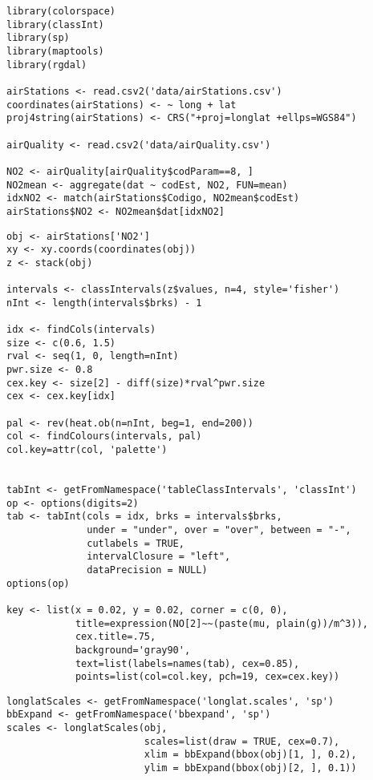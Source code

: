 



\lstset{language=R}
\begin{lstlisting}
library(colorspace)
library(classInt)
library(sp)
library(maptools)
library(rgdal)

airStations <- read.csv2('data/airStations.csv')
coordinates(airStations) <- ~ long + lat
proj4string(airStations) <- CRS("+proj=longlat +ellps=WGS84")

airQuality <- read.csv2('data/airQuality.csv')

NO2 <- airQuality[airQuality$codParam==8, ]
NO2mean <- aggregate(dat ~ codEst, NO2, FUN=mean)
idxNO2 <- match(airStations$Codigo, NO2mean$codEst)
airStations$NO2 <- NO2mean$dat[idxNO2]
\end{lstlisting}


\lstset{language=R}
\begin{lstlisting}
obj <- airStations['NO2']
xy <- xy.coords(coordinates(obj))
z <- stack(obj)

intervals <- classIntervals(z$values, n=4, style='fisher')
nInt <- length(intervals$brks) - 1

idx <- findCols(intervals)
size <- c(0.6, 1.5)
rval <- seq(1, 0, length=nInt)
pwr.size <- 0.8
cex.key <- size[2] - diff(size)*rval^pwr.size 
cex <- cex.key[idx]

pal <- rev(heat.ob(n=nInt, beg=1, end=200))
col <- findColours(intervals, pal)
col.key=attr(col, 'palette')


tabInt <- getFromNamespace('tableClassIntervals', 'classInt')
op <- options(digits=2)
tab <- tabInt(cols = idx, brks = intervals$brks,
              under = "under", over = "over", between = "-", 
              cutlabels = TRUE,
              intervalClosure = "left",
              dataPrecision = NULL)
options(op)

key <- list(x = 0.02, y = 0.02, corner = c(0, 0),
            title=expression(NO[2]~~(paste(mu, plain(g))/m^3)),
            cex.title=.75,
            background='gray90', 
            text=list(labels=names(tab), cex=0.85),
            points=list(col=col.key, pch=19, cex=cex.key))
\end{lstlisting}


\lstset{language=R}
\begin{lstlisting}
longlatScales <- getFromNamespace('longlat.scales', 'sp')
bbExpand <- getFromNamespace('bbexpand', 'sp')
scales <- longlatScales(obj,
                        scales=list(draw = TRUE, cex=0.7),
                        xlim = bbExpand(bbox(obj)[1, ], 0.2),
                        ylim = bbExpand(bbox(obj)[2, ], 0.1))
\end{lstlisting}

